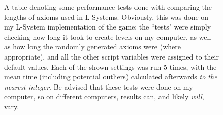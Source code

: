\begin{figure}[H]
\begin{center}
{\begin{tabular}{|c|c|c|c|}
    \end{tabular}%
    }
    \end{center}
    \caption{A table denoting some performance tests done with comparing the lengths of axioms used in L-Systems. Obviously, this was done on my L-System implementation of the game; the ``tests" were simply checking how long it took to create levels on my computer, as well as how long the randomly generated axioms were (where appropriate), and all the other script variables were assigned to their default values. Each of the shown settings was run 5 times, with the mean time (including potential outliers) calculated afterwards \textit{to the nearest integer}. Be advised that these tests were done on my computer, so on different computers, results can, and likely \textit{will}, vary.}
    \label{fig:table3}
\end{figure}